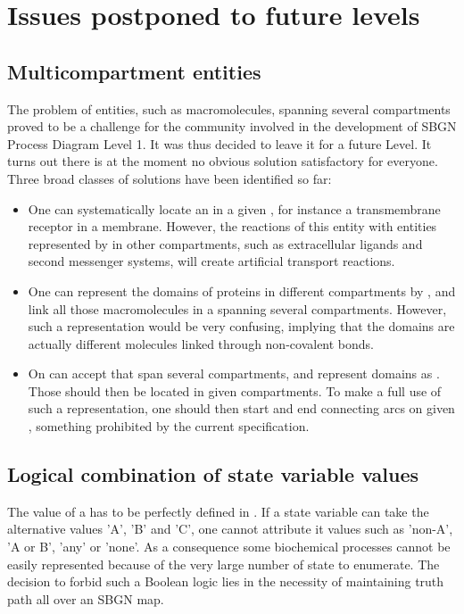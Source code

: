 \chapter{Issues postponed to future levels}\label{sec:postponed}

\section{Multicompartment entities}

The problem of entities, such as macromolecules, spanning several compartments proved to be a challenge for the community involved in the development of SBGN Process Diagram Level 1. It was thus decided to leave it for a future Level. It turns out there is at the moment no obvious solution satisfactory for everyone. Three broad classes of solutions have been identified so far:

\begin{itemize}
\item One can systematically locate an  in a given , for instance a transmembrane receptor in a membrane. However, the reactions of this entity with entities represented by  in other compartments, such as extracellular ligands and second messenger systems, will create artificial transport reactions.
\item One can represent the domains of proteins in different compartments by , and link all those macromolecules in a  spanning several compartments. However, such a representation would be very confusing, implying that the domains are actually different molecules linked through non-covalent bonds.
\item On can accept  that span several compartments, and represent domains as . Those  should then be located in given compartments. To make a full use of such a representation, one should then start and end connecting arcs on given , something prohibited by the current specification.
\end{itemize}

\section{Logical combination of state variable values}

The value of a  has to be perfectly defined in \SBGNPDLone. If a state variable can take the alternative values 'A', 'B' and 'C',  one cannot attribute it values such as 'non-A', 'A or B', 'any' or 'none'. As a consequence some biochemical processes cannot be easily represented because of the very large number of state to enumerate. The decision to forbid such a Boolean logic lies in the necessity of maintaining truth path all over an SBGN map. 

